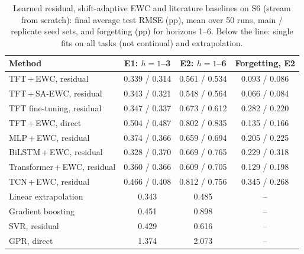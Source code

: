 \documentclass[conference]{IEEEtran}
\begin{document}
\begin{table}[t]
  \centering
  \caption{Learned residual, shift-adaptive EWC and literature baselines on S6 (stream from scratch): final average test RMSE (pp), mean over 50 runs, main / replicate seed sets, and forgetting (pp) for horizons 1--6. Below the line: single fits on all tasks (not continual) and extrapolation.}
  \label{tab:residual}
  \setlength{\tabcolsep}{2.5pt}
  \scriptsize
  \begin{tabular}{lccc}
    \toprule
    Method & E1: $h{=}1$--3 & E2: $h{=}1$--6 & Forgetting, E2 \\
    \midrule
    TFT\,+\,EWC, residual & 0.339 / 0.314 & 0.561 / 0.534 & 0.093 / 0.086 \\
    TFT\,+\,SA-EWC, residual & 0.343 / 0.321 & 0.548 / 0.564 & 0.066 / 0.084 \\
    TFT fine-tuning, residual & 0.347 / 0.337 & 0.673 / 0.612 & 0.282 / 0.220 \\
    TFT\,+\,EWC, direct & 0.504 / 0.487 & 0.802 / 0.835 & 0.135 / 0.166 \\
    MLP\,+\,EWC, residual & 0.374 / 0.366 & 0.659 / 0.694 & 0.205 / 0.225 \\
    BiLSTM\,+\,EWC, residual & 0.328 / 0.370 & 0.669 / 0.765 & 0.229 / 0.318 \\
    Transformer\,+\,EWC, residual & 0.360 / 0.366 & 0.609 / 0.705 & 0.129 / 0.198 \\
    TCN\,+\,EWC, residual & 0.466 / 0.408 & 0.812 / 0.756 & 0.345 / 0.268 \\
    \midrule
    Linear extrapolation & 0.343 & 0.485 & -- \\
    Gradient boosting & 0.451 & 0.898 & -- \\
    SVR, residual & 0.429 & 0.616 & -- \\
    GPR, direct & 1.374 & 2.073 & -- \\
    \bottomrule
  \end{tabular}
\end{table}


\end{document}
